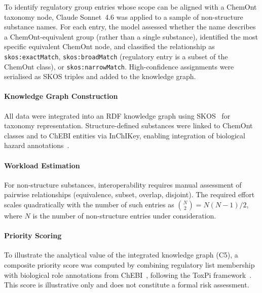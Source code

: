 To identify regulatory group entries whose scope can be aligned with a ChemOnt taxonomy node, Claude Sonnet~4.6 was applied to a sample of non-structure substance names. For each entry, the model assessed whether the name describes a ChemOnt-equivalent group (rather than a single substance), identified the most specific equivalent ChemOnt node, and classified the relationship as \texttt{skos:exactMatch}, \texttt{skos:broadMatch} (regulatory entry is a subset of the ChemOnt class), or \texttt{skos:narrowMatch}. High-confidence assignments were serialised as SKOS triples and added to the knowledge graph.

\paragraph{Knowledge Graph Construction}

All data were integrated into an RDF knowledge graph using SKOS~\cite{W3C2009SKOS} for taxonomy representation. Structure-defined substances were linked to ChemOnt classes and to ChEBI entities via InChIKey, enabling integration of biological hazard annotations~\cite{W3C2017OA}.

\paragraph{Workload Estimation}

For non-structure substances, interoperability requires manual assessment of pairwise relationships (equivalence, subset, overlap, disjoint). The required effort scales quadratically with the number of such entries as $\binom{N}{2} = N(N-1)/2$, where $N$ is the number of non-structure entries under consideration.

\paragraph{Priority Scoring}
\label{sec:priority_score}

To illustrate the analytical value of the integrated knowledge graph (C5), a composite priority score was computed by combining regulatory list membership with biological role annotations from ChEBI~\cite{Degtyarenko2008}, following the ToxPi framework~\cite{Reif2010}. This score is illustrative only and does not constitute a formal risk assessment.
